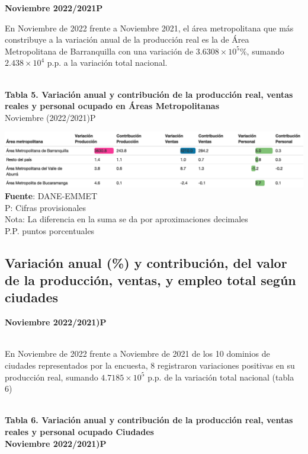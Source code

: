\documentclass[
]{article}
\begin{document}
\textbf{Noviembre 2022/2021P}

En Noviembre de 2022 frente a Noviembre 2021, el área metropolitana que
más constribuye a la variación anual de la producción real es la de Área
Metropolitana de Barranquilla con una variación de
\ensuremath{3.6308\times 10^{5}}\%, sumando
\ensuremath{2.438\times 10^{4}} p.p. a la variación total nacional.\\
\strut \\

\textbf{Tabla 5. Variación anual y contribución de la producción real,
ventas reales y personal ocupado en Áreas Metropolitanas}\\
Noviembre (2022/2021)P

\includegraphics{boletin_files/figure-latex/tabl5_view-1.png}
\textbf{Fuente}: DANE-EMMET\\
P: Cifras provisionales\\
Nota: La diferencia en la suma se da por aproximaciones decimales\\
P.P. puntos porcentuales\\

\hypertarget{variaciuxf3n-anual-y-contribuciuxf3n-del-valor-de-la-producciuxf3n-ventas-y-empleo-total-seguxfan-ciudades}{%
\subsection{Variación anual (\%) y contribución, del valor de la
producción, ventas, y empleo total según
ciudades}\label{variaciuxf3n-anual-y-contribuciuxf3n-del-valor-de-la-producciuxf3n-ventas-y-empleo-total-seguxfan-ciudades}}

\textbf{Noviembre 2022/2021)P}\\
\strut \\

En Noviembre de 2022 frente a Noviembre de 2021 de los 10 dominios de
ciudades representados por la encuesta, 8 registraron variaciones
positivas en su producción real, sumando
\ensuremath{4.7185\times 10^{5}} p.p. de la variación total nacional
(tabla 6)\\
\strut \\
\textbf{Tabla 6. Variación anual y contribución de la producción real,
ventas reales y personal ocupado Ciudades}\\
\textbf{Noviembre 2022/2021)P}\\
\end{document}
